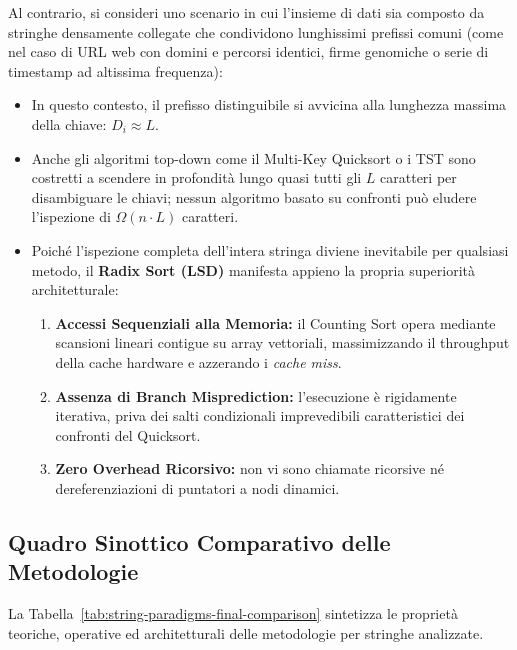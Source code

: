 Al contrario, si consideri uno scenario in cui l'insieme di dati sia composto da stringhe densamente collegate che condividono lunghissimi prefissi comuni (come nel caso di URL web con domini e percorsi identici, firme genomiche o serie di timestamp ad altissima frequenza):
\begin{itemize}
  \item In questo contesto, il prefisso distinguibile si avvicina alla lunghezza massima della chiave: $D_i \approx L$.
  \item Anche gli algoritmi top-down come il Multi-Key Quicksort o i TST sono costretti a scendere in profondit\`a lungo quasi tutti gli $L$ caratteri per disambiguare le chiavi; nessun algoritmo basato su confronti pu\`o eludere l'ispezione di $\Omega(n \cdot L)$ caratteri.
  \item Poich\'e l'ispezione completa dell'intera stringa diviene inevitabile per qualsiasi metodo, il \textbf{Radix Sort (LSD)} manifesta appieno la propria superiorit\`a architetturale:
  \begin{enumerate}
    \item \textbf{Accessi Sequenziali alla Memoria:} il Counting Sort opera mediante scansioni lineari contigue su array vettoriali, massimizzando il throughput della cache hardware e azzerando i \textit{cache miss}.
    \item \textbf{Assenza di Branch Misprediction:} l'esecuzione \`e rigidamente iterativa, priva dei salti condizionali imprevedibili caratteristici dei confronti del Quicksort.
    \item \textbf{Zero Overhead Ricorsivo:} non vi sono chiamate ricorsive n\'e dereferenziazioni di puntatori a nodi dinamici.
  \end{enumerate}
\end{itemize}

\FloatBarrier
\subsection{Quadro Sinottico Comparativo delle Metodologie}
\label{subsec:quadro-sinottico-finale}

La Tabella~\ref{tab:string-paradigms-final-comparison} sintetizza le propriet\`a teoriche, operative ed architetturali delle metodologie per stringhe analizzate.


